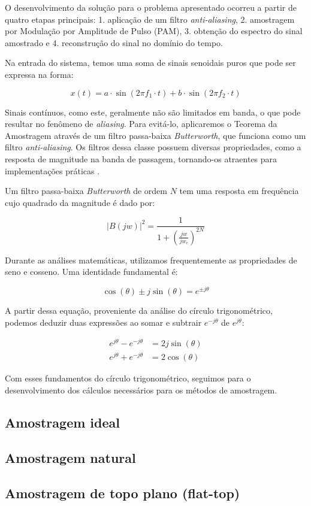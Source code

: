 O desenvolvimento da solução para o problema apresentado ocorreu a partir de quatro etapas principais: 1. aplicação de um filtro \textit{anti-aliasing}, 2. amostragem por Modulação por Amplitude de Pulso (PAM), 3. obtenção do espectro do sinal amostrado e 4. reconstrução do sinal no domínio do tempo.

Na entrada do sistema, temos uma soma de sinais senoidais puros que pode ser expressa na forma:

\begin{equation}
    x(t) = a \cdot \sin(2\pi f_1 \cdot t) + b \cdot \sin(2\pi f_2 \cdot t)
\end{equation}

Sinais contínuos, como este, geralmente não são limitados em banda, o que pode resultar no fenômeno de \textit{aliasing}. Para evitá-lo, aplicaremos o Teorema da Amostragem através de um filtro passa-baixa \textit{Butterworth}, que funciona como um filtro \textit{anti-aliasing}. Os filtros dessa classe possuem diversas propriedades, como a resposta de magnitude na banda de passagem, tornando-os atraentes para implementações práticas \cite{b2}.

Um filtro passa-baixa \textit{Butterworth} de ordem $N$ tem uma resposta em frequência cujo quadrado da magnitude é dado por:

\begin{equation}
    |B(jw)|^2 = \frac{1}{1 + \left( \frac{jw}{jw_c} \right)^{2N}} 
\end{equation}

Durante as análises matemáticas, utilizamos frequentemente as propriedades de seno e cosseno. Uma identidade fundamental é:

\begin{equation}
    \cos(\theta) \pm j\sin(\theta) = e^{\pm j\theta}
\end{equation}

A partir dessa equação, proveniente da análise do círculo trigonométrico, podemos deduzir duas expressões ao somar e subtrair $e^{-j\theta}$ de $e^{j\theta}$:

\begin{align}
    e^{j\theta} - e^{-j\theta} &= 2j\sin(\theta) \\
    e^{j\theta} + e^{-j\theta} &= 2\cos(\theta)
\end{align}

Com esses fundamentos do círculo trigonométrico, seguimos para o desenvolvimento dos cálculos necessários para os métodos de amostragem.

\subsection{Amostragem ideal}


\subsection{Amostragem natural}


\subsection{Amostragem de topo plano (flat-top)}

